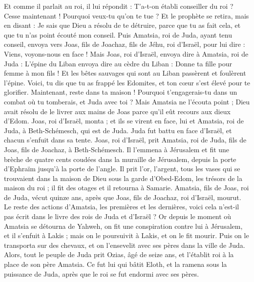 \begin{multicols}{2}
Et comme il parlait au roi, il lui répondit : T'a-t-on établi conseiller du roi ? Cesse maintenant ! Pourquoi veux-tu qu'on te tue ? Et le prophète se retira, mais en disant : Je sais que Dieu a résolu de te détruire, parce que tu as fait cela, et que tu n'as point écouté mon conseil.
Puis Amatsia, roi de Juda, ayant tenu conseil, envoya vers Joas, fils de Joachaz, fils de Jéhu, roi d'Israël, pour lui dire : Viens, voyons-nous en face !
Mais Joas, roi d'Israël, envoya dire à Amatsia, roi de Juda : L'épine du Liban envoya dire au cèdre du Liban : Donne ta fille pour femme à mon fils ! Et les bêtes sauvages qui sont au Liban passèrent et foulèrent l'épine.
Voici, tu dis que tu as frappé les Edomites, et ton cœur s'est élevé pour te glorifier. Maintenant, reste dans ta maison ! Pourquoi t'engagerais-tu dans un combat où tu tomberais, et Juda avec toi ?
Mais Amatsia ne l'écouta point ; Dieu avait résolu de le livrer aux mains de Joas parce qu’il eût recours aux dieux d'Edom.
Joas, roi d'Israël, monta ; et ils se virent en face, lui et Amatsia, roi de Juda, à Beth-Schémesch, qui est de Juda.
Juda fut battu en face d’Israël, et chacun s'enfuit dans sa tente.
Joas, roi d'Israël, prit Amatsia, roi de Juda, fils de Joas, fils de Joachaz, à Beth-Schémesch. Il l'emmena à Jérusalem et fit une brèche de quatre cents coudées dans la muraille de Jérusalem, depuis la porte d'Ephraïm jusqu'à la porte de l’angle.
Il prit l'or, l'argent, tous les vases qui se trouvaient dans la maison de Dieu sous la garde d'Obed-Edom, les trésors de la maison du roi ; il fit des otages et il retourna à Samarie.
Amatsia, fils de Joas, roi de Juda, vécut quinze ans, après que Joas, fils de Joachaz, roi d'Israël, mourut.
Le reste des actions d'Amatsia, les premières et les dernières, voici cela n'est-il pas écrit dans le livre des rois de Juda et d'Israël ?
Or depuis le moment où Amatsia se détourna de Yahweh, on fit une conspiration contre lui à Jérusalem, et il s'enfuit à Lakis ; mais on le poursuivit à Lakis, et on le fit mourir.
Puis on le transporta sur des chevaux, et on l'ensevelit avec ses pères dans la ville de Juda.
\VerseOne{}Alors, tout le peuple de Juda prit Ozias, âgé de seize ans, et l'établit roi à la place de son père Amatsia.
Ce fut lui qui bâtit Eloth, et la ramena sous la puissance de Juda, après que le roi se fut endormi avec ses pères.

\end{multicols}
